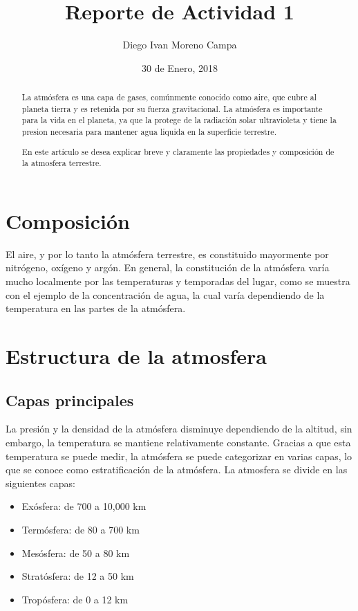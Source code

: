 \documentclass{article} %
\title{Reporte de Actividad 1}
\author{Diego Ivan Moreno Campa}
\date{30 de Enero, 2018}
\begin{document}
\maketitle %

\bigskip

\renewcommand{\abstractname}{Introducción}

\begin{abstract}

La atmósfera es una capa de gases, comúnmente conocido como aire, que cubre al planeta tierra y es retenida por su fuerza gravitacional. La atmósfera es importante para la vida en el planeta, ya que la protege de la radiación solar ultravioleta y tiene la presion necesaria para mantener agua liquida en la superficie terrestre.

En este artículo se desea explicar breve y claramente las propiedades y composición de la atmosfera terrestre.

\end{abstract}

\section{Composición}
El aire, y por lo tanto la atmósfera terrestre, es constituido mayormente por nitrógeno, oxígeno y argón. En general, la constitución de la atmósfera varía mucho localmente por las temperaturas y temporadas del lugar, como se muestra con el ejemplo de la concentración de agua, la cual varía dependiendo de la temperatura en las partes de la atmósfera.

\section{Estructura de la atmosfera}
\subsection{Capas principales}

La presión y la densidad de la atmósfera disminuye dependiendo de la altitud, sin embargo, la temperatura se mantiene relativamente constante. Gracias a que esta temperatura se puede medir, la atmósfera se puede categorizar en varias capas, lo que se conoce como estratificación de la atmósfera.
La atmosfera se divide en las siguientes capas:

\begin{itemize}
\item Exósfera: de 700 a 10,000 km 
\item Termósfera: de 80 a 700 km
\item Mesósfera: de 50 a 80 km
\item Stratósfera: de 12 a 50 km
\item Tropósfera: de 0 a 12 km
\end{itemize}
\end{document}
